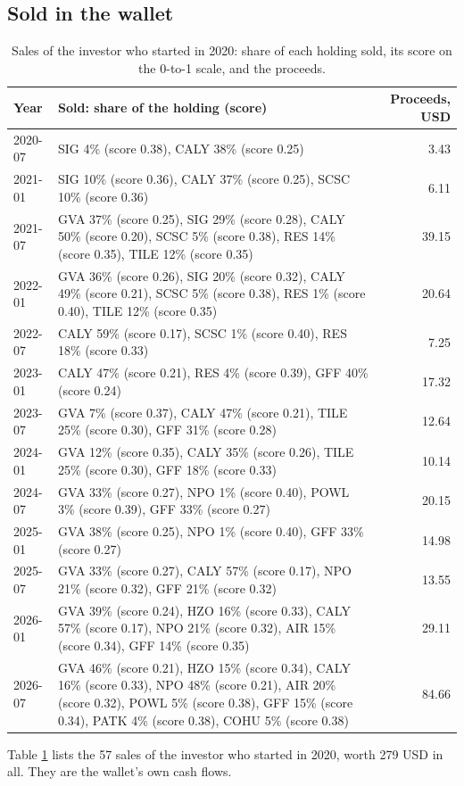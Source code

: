 \documentclass[11pt,a4paper]{article}
\begin{document}
\subsection{Sold in the wallet}
\begin{table}[H]
\centering
\small
\caption{Sales of the investor who started in 2020: share of each holding sold, its score on the 0-to-1 scale, and the proceeds.}\label{tab:sales}
\begin{tabular}{l p{11cm} r}
\hline
Year & Sold: share of the holding (score) & Proceeds, USD \\
\hline
2020-07 & SIG 4\% (score 0.38), CALY 38\% (score 0.25) & 3.43 \\
2021-01 & SIG 10\% (score 0.36), CALY 37\% (score 0.25), SCSC 10\% (score 0.36) & 6.11 \\
2021-07 & GVA 37\% (score 0.25), SIG 29\% (score 0.28), CALY 50\% (score 0.20), SCSC 5\% (score 0.38), RES 14\% (score 0.35), TILE 12\% (score 0.35) & 39.15 \\
2022-01 & GVA 36\% (score 0.26), SIG 20\% (score 0.32), CALY 49\% (score 0.21), SCSC 5\% (score 0.38), RES 1\% (score 0.40), TILE 12\% (score 0.35) & 20.64 \\
2022-07 & CALY 59\% (score 0.17), SCSC 1\% (score 0.40), RES 18\% (score 0.33) & 7.25 \\
2023-01 & CALY 47\% (score 0.21), RES 4\% (score 0.39), GFF 40\% (score 0.24) & 17.32 \\
2023-07 & GVA 7\% (score 0.37), CALY 47\% (score 0.21), TILE 25\% (score 0.30), GFF 31\% (score 0.28) & 12.64 \\
2024-01 & GVA 12\% (score 0.35), CALY 35\% (score 0.26), TILE 25\% (score 0.30), GFF 18\% (score 0.33) & 10.14 \\
2024-07 & GVA 33\% (score 0.27), NPO 1\% (score 0.40), POWL 3\% (score 0.39), GFF 33\% (score 0.27) & 20.15 \\
2025-01 & GVA 38\% (score 0.25), NPO 1\% (score 0.40), GFF 33\% (score 0.27) & 14.98 \\
2025-07 & GVA 33\% (score 0.27), CALY 57\% (score 0.17), NPO 21\% (score 0.32), GFF 21\% (score 0.32) & 13.55 \\
2026-01 & GVA 39\% (score 0.24), HZO 16\% (score 0.33), CALY 57\% (score 0.17), NPO 21\% (score 0.32), AIR 15\% (score 0.34), GFF 14\% (score 0.35) & 29.11 \\
2026-07 & GVA 46\% (score 0.21), HZO 15\% (score 0.34), CALY 16\% (score 0.33), NPO 48\% (score 0.21), AIR 20\% (score 0.32), POWL 5\% (score 0.38), GFF 15\% (score 0.34), PATK 4\% (score 0.38), COHU 5\% (score 0.38) & 84.66 \\
\hline
\end{tabular}
\end{table}
Table \ref{tab:sales} lists the 57 sales of the investor who started in 2020, worth 279 USD in all. They are the wallet's own cash flows.
\end{document}
